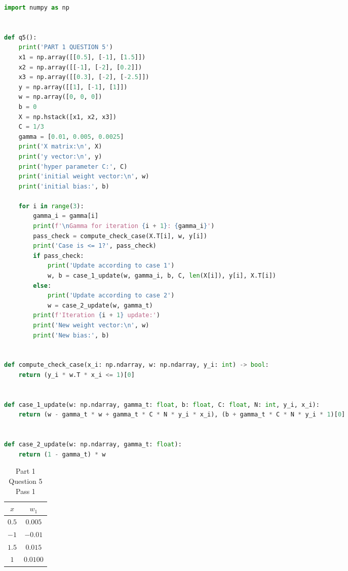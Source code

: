 \documentclass[12pt, fullpage,letterpaper]{article}
\begin{document}
\begin{enumerate}
\begin{verbatim}
\end{verbatim}
	
	\begin{lstlisting}[language=Python, caption=Functions used to generate results for Part 1 Question 5]
import numpy as np


def q5():
    print('PART 1 QUESTION 5')
    x1 = np.array([[0.5], [-1], [1.5]])
    x2 = np.array([[-1], [-2], [0.2]])
    x3 = np.array([[0.3], [-2], [-2.5]])
    y = np.array([[1], [-1], [1]])
    w = np.array([0, 0, 0])
    b = 0
    X = np.hstack([x1, x2, x3])
    C = 1/3
    gamma = [0.01, 0.005, 0.0025]
    print('X matrix:\n', X)
    print('y vector:\n', y)
    print('hyper parameter C:', C)
    print('initial weight vector:\n', w)
    print('initial bias:', b)

    for i in range(3):
        gamma_i = gamma[i]
        print(f'\nGamma for iteration {i + 1}: {gamma_i}')
        pass_check = compute_check_case(X.T[i], w, y[i])
        print('Case is <= 1?', pass_check)
        if pass_check:
            print('Update according to case 1')
            w, b = case_1_update(w, gamma_i, b, C, len(X[i]), y[i], X.T[i])
        else:
            print('Update according to case 2')
            w = case_2_update(w, gamma_t)
        print(f'Iteration {i + 1} update:')
        print('New weight vector:\n', w)
        print('New bias:', b)


def compute_check_case(x_i: np.ndarray, w: np.ndarray, y_i: int) -> bool:
    return (y_i * w.T * x_i <= 1)[0]
 

def case_1_update(w: np.ndarray, gamma_t: float, b: float, C: float, N: int, y_i, x_i):
    return (w - gamma_t * w + gamma_t * C * N * y_i * x_i), (b + gamma_t * C * N * y_i * 1)[0]


def case_2_update(w: np.ndarray, gamma_t: float):
    return (1 - gamma_t) * w

    \end{lstlisting}
	
	\begin{table}[h]
		\centering
		\begin{tabular}{c|c}
			$x$ & $w_1$ \\ 
			\hline\hline
			$0.5$ & $0.005$  \\ \hline
			$-1$  & $-0.01$  \\ \hline
			$1.5$ & $0.015$  \\ \hline
			$1$   & $0.0100$ \\ \hline
		\end{tabular}
	\caption{Part 1 Question 5 Pass 1}
	\end{table}
	

\end{enumerate}
\end{document}
